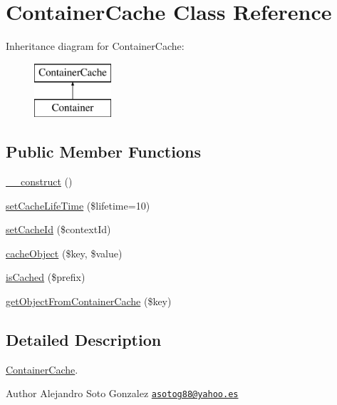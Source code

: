 \hypertarget{class_container_cache}{\section{Container\-Cache Class Reference}
\label{class_container_cache}
}
Inheritance diagram for Container\-Cache\-:\begin{figure}[H]
\begin{center}
\leavevmode
\includegraphics[height=2.000000cm]{class_container_cache}
\end{center}
\end{figure}
\subsection*{Public Member Functions}
\begin{DoxyCompactItemize}
\item 
\hyperlink{class_container_cache_a095c5d389db211932136b53f25f39685}{\-\_\-\-\_\-construct} ()
\item 
\hyperlink{class_container_cache_a726aa40421f32238c80b7483f212cb42}{set\-Cache\-Life\-Time} (\$lifetime=10)
\item 
\hyperlink{class_container_cache_a68fef45c3ef0edcdba13f08e122c9da1}{set\-Cache\-Id} (\$context\-Id)
\item 
\hyperlink{class_container_cache_aba9ad2016d1c2fcb3ba986ca90e434bb}{cache\-Object} (\$key, \$value)
\item 
\hyperlink{class_container_cache_a4108b934c8301f52056402226912c17f}{is\-Cached} (\$prefix)
\item 
\hyperlink{class_container_cache_a7a9112e3be938ede001b443f227de2e4}{get\-Object\-From\-Container\-Cache} (\$key)
\end{DoxyCompactItemize}


\subsection{Detailed Description}
\hyperlink{class_container_cache}{Container\-Cache}.

\begin{DoxyAuthor}{Author}
Alejandro Soto Gonzalez \href{mailto:asotog88@yahoo.es}{\tt asotog88@yahoo.\-es} 
\end{DoxyAuthor}


